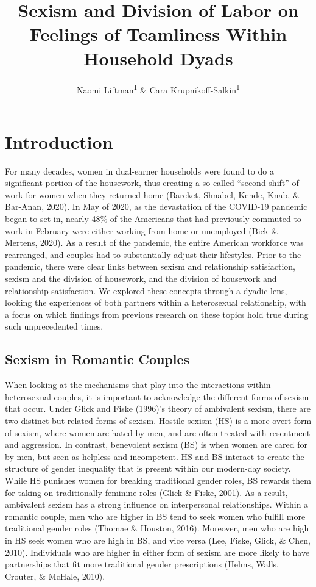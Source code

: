 \documentclass[
  english,
  man]{apa6}
\title{Sexism and Division of Labor on Feelings of Teamliness Within Household Dyads}
\author{Naomi Liftman\textsuperscript{1} \& Cara Krupnikoff-Salkin\textsuperscript{1}}
\date{}
\affiliation{\vspace{0.5cm}\textsuperscript{1} Smith College}
\begin{document}
\maketitle

\hypertarget{introduction}{%
\section{Introduction}\label{introduction}}

For many decades, women in dual-earner households were found to do a significant portion of the housework, thus creating a so-called \enquote{second shift} of work for women when they returned home (Bareket, Shnabel, Kende, Knab, \& Bar-Anan, 2020). In May of 2020, as the devastation of the COVID-19 pandemic began to set in, nearly 48\% of the Americans that had previously commuted to work in February were either working from home or unemployed (Bick \& Mertens, 2020). As a result of the pandemic, the entire American workforce was rearranged, and couples had to substantially adjust their lifestyles. Prior to the pandemic, there were clear links between sexism and relationship satisfaction, sexism and the division of housework, and the division of housework and relationship satisfaction. We explored these concepts through a dyadic lens, looking the experiences of both partners within a heterosexual relationship, with a focus on which findings from previous research on these topics hold true during such unprecedented times.

\hypertarget{sexism-in-romantic-couples}{%
\subsection{Sexism in Romantic Couples}\label{sexism-in-romantic-couples}}

When looking at the mechanisms that play into the interactions within heterosexual couples, it is important to acknowledge the different forms of sexism that occur. Under Glick and Fiske (1996)'s theory of ambivalent sexism, there are two distinct but related forms of sexism. Hostile sexism (HS) is a more overt form of sexism, where women are hated by men, and are often treated with resentment and aggression. In contrast, benevolent sexism (BS) is when women are cared for by men, but seen as helpless and incompetent. HS and BS interact to create the structure of gender inequality that is present within our modern-day society. While HS punishes women for breaking traditional gender roles, BS rewards them for taking on traditionally feminine roles (Glick \& Fiske, 2001). As a result, ambivalent sexism has a strong influence on interpersonal relationships. Within a romantic couple, men who are higher in BS tend to seek women who fulfill more traditional gender roles (Thomae \& Houston, 2016). Moreover, men who are high in HS seek women who are high in BS, and vice versa (Lee, Fiske, Glick, \& Chen, 2010). Individuals who are higher in either form of sexism are more likely to have partnerships that fit more traditional gender prescriptions (Helms, Walls, Crouter, \& McHale, 2010).
\end{document}
